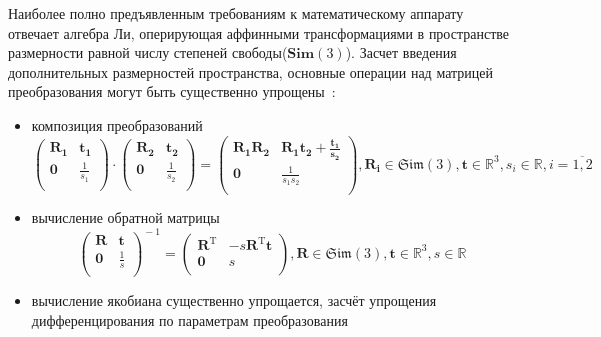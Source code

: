 Наиболее полно предъявленным требованиям к математическому аппарату отвечает алгебра Ли, оперирующая аффинными трансформациями в пространстве размерности равной числу степеней свободы($\mathbf{Sim}(3)$). Засчет введения дополнительных размерностей пространства, основные операции над матрицей преобразования могут быть существенно упрощены~\cite{lieGroups}:
\begin{itemize}
    \item композиция преобразований
    \begin{equation}
        \begin{pmatrix}
        \mathbf{R_1} & \mathbf{t_1}  \\
        \mathbf{0} & \frac{1}{s_1} \\
        \end{pmatrix}
        \cdot
        \begin{pmatrix}
        \mathbf{R_2} & \mathbf{t_2}  \\
        \mathbf{0} & \frac{1}{s_2} \\
        \end{pmatrix}
        =
        \begin{pmatrix}
        \mathbf{R_1}\mathbf{R_2} & \mathbf{R_1}\mathbf{t_2} + \frac{\mathbf{t_1}}{\mathbf{s_2}}  \\
        \mathbf{0} & \frac{1}{s_1 s_2} \\
        \end{pmatrix}, \mathbf{R_i} \in \mathfrak{Sim}(3), \mathbf{t} \in \mathbb{R}^3, s_i \in \mathbb{R}, i = \overline{1,2}
    \end{equation}
    \item вычисление обратной матрицы
    \begin{equation}
        \begin{pmatrix}
        \mathbf{R} & \mathbf{t}  \\
        \mathbf{0} & \frac{1}{s} \\
        \end{pmatrix}
        ^{\!-1}
        =
        \begin{pmatrix}
        \mathbf{R}^\mathrm{T} & -s\mathbf{R}^\mathrm{T}\mathbf{t} \\
        \mathbf{0} & s \\
        \end{pmatrix}, \mathbf{R} \in \mathfrak{Sim}(3), \mathbf{t} \in \mathbb{R}^3, s \in \mathbb{R}
    \end{equation}
    \item вычисление якобиана существенно упрощается, засчёт упрощения дифференцирования по параметрам преобразования

\end{itemize}
